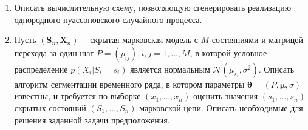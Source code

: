 \documentclass[a4paper,12pt]{extreport}
\renewcommand{\=}[1]{\stackrel{#1}{=}} %
\newcommand{\Expect}{\mathop{{}\mathrm{E}}}
\begin{document}
\begin{enumerate}
    \item Описать вычислительную схему, позволяющую
    сгенерировать реализацию однородного пуассоновского случайного процесса.





    \item Пусть $(\bm{S}_n, \bm{X}_n)$~--
    скрытая марковская модель с $M$ состояниями и матрицей
    перехода за один шаг $P = (p_{ij}), i, j = 1, \ldots, M$,
    в которой условное распределение $p(X_i | S_i = s_i)$ является
    нормальным $\mathcal{N}(\mu_{s_i}, \sigma^2)$.
    Описать алгоритм сегментации временного ряда, в котором 
    параметры $\bm{\theta} = (P, \bm{\mu}, \sigma)$ известны,
    и требуется по выборке $(x_1, \ldots, x_n)$ 
    оценить значения $(s_1, \ldots, s_n)$ скрытых состояний
    $(S_1, \ldots, S_n)$  марковской цепи. Описать необходимые
    для решения заданной задачи предположения.


\end{enumerate}
\end{document}
